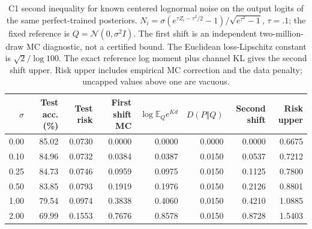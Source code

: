 \begin{table}[t]
\centering\footnotesize
\caption{C1 second inequality for known centered lognormal noise on the output logits of the same perfect-trained posteriors. $N_i=\sigma(e^{\tau Z_i-\tau^2/2}-1)/\sqrt{e^{\tau^2}-1}$, $\tau=.1$; the fixed reference is $Q=\mathcal N(0,\sigma^2I)$. The first shift is an independent two-million-draw MC diagnostic, not a certified bound. The Euclidean loss-Lipschitz constant is $\sqrt2/\log100$. The exact reference log moment plus channel KL gives the second shift upper. Risk upper includes empirical MC correction and the data penalty; uncapped values above one are vacuous.}
\label{tab:c1_lognormal}
\begin{tabular}{rrrrrrrr}
\toprule
$\sigma$ & Test acc. (\%) & Test risk & First shift MC & $\log\mathbb E_Qe^{Kd}$ & $D(P\Vert Q)$ & Second shift & Risk upper\\
\midrule
0.00 & 85.02 & 0.0730 & 0.0000 & 0.0000 & 0.0000 & 0.0000 & 0.6675\\
0.10 & 84.96 & 0.0732 & 0.0384 & 0.0387 & 0.0150 & 0.0537 & 0.7212\\
0.25 & 84.73 & 0.0746 & 0.0959 & 0.0975 & 0.0150 & 0.1125 & 0.7800\\
0.50 & 83.85 & 0.0793 & 0.1919 & 0.1976 & 0.0150 & 0.2126 & 0.8801\\
1.00 & 79.54 & 0.0974 & 0.3838 & 0.4060 & 0.0150 & 0.4210 & 1.0885\\
2.00 & 69.99 & 0.1553 & 0.7676 & 0.8578 & 0.0150 & 0.8728 & 1.5403\\
\bottomrule
\end{tabular}
\end{table}
